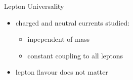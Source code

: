 \begin{frame}{Lepton Universality}
    \begin{itemize}
        \item charged and neutral currents studied:
        \begin{itemize}
            \item inpependent of mass
            \item constant coupling to all leptons
        \end{itemize}
        \item [\rightarrow] lepton flavour does not matter
    \end{itemize}
\end{frame}